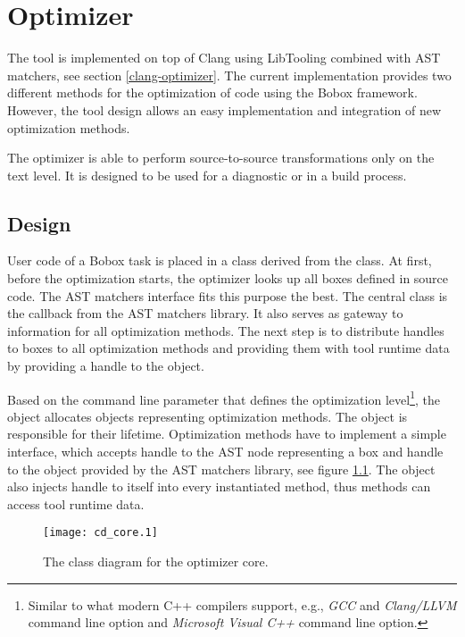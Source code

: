 \chapter{Optimizer}
\label{chapter-design}
The tool is implemented on top of Clang using LibTooling combined with AST matchers, see section \ref{clang-optimizer}. The current implementation provides two different methods for the optimization of code using the Bobox framework. However, the tool design allows an easy implementation and integration of new optimization methods.

The optimizer is able to perform source-to-source transformations only on the text level. It is designed to be used for a diagnostic or in a build process.

\section{Design}
User code of a Bobox task is placed in a class derived from the  class. At first, before the optimization starts, the optimizer looks up all boxes defined in source code. The AST matchers interface fits this purpose the best. The central  class is the callback from the AST matchers library. It also serves as gateway to information for all optimization methods. The next step is to distribute handles to boxes to all optimization methods and providing them with tool runtime data by providing a handle to the  object.

Based on the command line parameter that defines the optimization level\footnote{Similar to what modern C++ compilers support, e.g., \emph{GCC} and \emph{Clang/LLVM}  command line option and \emph{Microsoft Visual C++}  command line option.}, the  object allocates objects representing optimization methods. The  object is responsible for their lifetime. Optimization methods have to implement a simple interface, which accepts handle to the AST node representing a box and handle to the  object provided by the AST matchers library, see figure \ref{class-optimizer}. The  object also injects handle to itself into every instantiated method, thus methods can access tool runtime data.

\begin{figure}[h!]
\caption{The class diagram for the optimizer core.}
\label{class-optimizer}
\vspace{0.5cm}
\centering
\texttt{[image: cd\_core.1]}
\end{figure}

